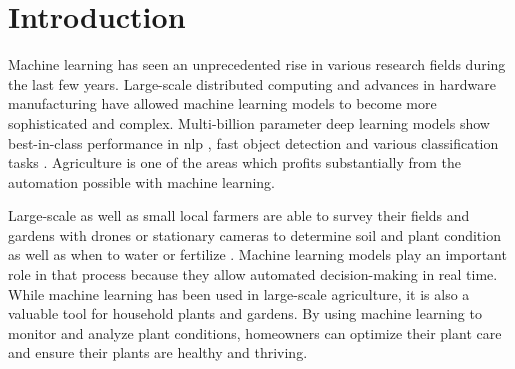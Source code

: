 \documentclass[draft,final]{vutinfth} %
\begin{document}
\frontmatter %

\addstatementpage

\begin{danksagung*}
\end{danksagung*}

\begin{acknowledgements*}
\end{acknowledgements*}

\begin{kurzfassung}
\end{kurzfassung}

\begin{abstract}
\end{abstract}


\tableofcontents %

\mainmatter

\chapter{Introduction}
\label{chap:introduction}

Machine learning has seen an unprecedented rise in various research
fields during the last few years. Large-scale distributed computing
and advances in hardware manufacturing have allowed machine learning
models to become more sophisticated and complex. Multi-billion
parameter deep learning models show best-in-class performance in
\gls{nlp} \cite{brown2020}, fast object detection
\cite{bochkovskiy2020} and various classification tasks
\cite{zhong2022,ariss2022}. Agriculture is one of the areas which
profits substantially from the automation possible with machine
learning.

Large-scale as well as small local farmers are able to survey their
fields and gardens with drones or stationary cameras to determine soil
and plant condition as well as when to water or
fertilize \cite{ramos-giraldo2020}. Machine learning models play an
important role in that process because they allow automated
decision-making in real time. While machine learning has been used in
large-scale agriculture, it is also a valuable tool for household
plants and gardens. By using machine learning to monitor and analyze
plant conditions, homeowners can optimize their plant care and ensure
their plants are healthy and thriving.
\end{document}
